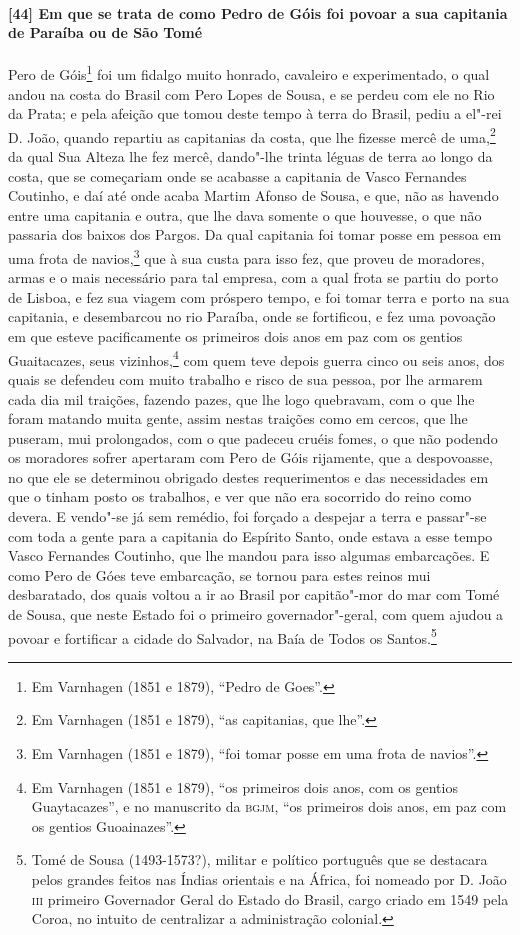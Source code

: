 \paragraph{[44] Em que se trata de como Pedro de Góis foi povoar a sua capitania de Paraíba
ou de São Tomé} \quad
Pero de Góis\footnote{ Em Varnhagen (1851 e 1879), ``Pedro de Goes''.} foi um fidalgo
muito honrado, cavaleiro e experimentado, o qual andou na costa do Brasil com Pero Lopes
de Sousa, e se perdeu com ele no Rio da Prata; e pela afeição que tomou deste tempo à
terra do Brasil, pediu a el"-rei D. João, quando repartiu as capitanias da costa, que lhe
fizesse mercê de uma,\footnote{ Em Varnhagen (1851 e 1879), ``as capitanias, que lhe''.}
da qual Sua Alteza lhe fez mercê, dando"-lhe trinta léguas de terra ao longo da costa, que
se começariam onde se acabasse a capitania de Vasco Fernandes Coutinho, e daí até onde
acaba Martim Afonso de Sousa, e que, não as havendo entre uma capitania e outra, que lhe
dava somente o que houvesse, o que não passaria dos baixos dos Pargos. Da qual capitania
foi tomar posse em pessoa em uma frota de navios,\footnote{ Em Varnhagen (1851 e 1879),
``foi tomar posse em uma frota de navios''.} que à sua custa para isso fez, que proveu de
moradores, armas e o mais necessário para tal empresa, com a qual frota se partiu do porto
de Lisboa, e fez sua viagem com próspero tempo, e foi tomar terra e porto na sua
capitania, e desembarcou no rio Paraíba, onde se fortificou, e fez uma povoação em que
esteve pacificamente os primeiros dois anos em paz com os gentios Guaitacazes, seus
vizinhos,\footnote{ Em Varnhagen (1851 e 1879), ``os primeiros dois anos, com os gentios
Guaytacazes'', e no manuscrito da \textsc{bgjm}, ``os primeiros dois anos, em paz com os
gentios Guoainazes''.} com quem teve depois guerra cinco ou seis anos, dos quais se
defendeu com muito trabalho e risco de sua pessoa, por lhe armarem cada dia mil traições,
fazendo pazes, que lhe logo quebravam, com o que lhe foram matando muita gente, assim
nestas traições como em cercos, que lhe puseram, mui prolongados, com o que padeceu cruéis
fomes, o que não podendo os moradores sofrer apertaram com Pero de Góis rijamente, que a
despovoasse, no que ele se determinou obrigado destes requerimentos e das necessidades em
que o tinham posto os trabalhos, e ver que não era socorrido do reino como devera. E
vendo"-se já sem remédio, foi forçado a despejar a terra e passar"-se com toda a gente para
a capitania do Espírito Santo, onde estava a esse tempo Vasco Fernandes Coutinho, que lhe
mandou para isso algumas embarcações. E como Pero de Góes teve embarcação, se tornou para
estes reinos mui desbaratado, dos quais voltou a ir ao Brasil por capitão"-mor do mar com
Tomé de Sousa, que neste Estado foi o primeiro governador"-geral, com quem ajudou a povoar
e fortificar a cidade do Salvador, na Baía de Todos os Santos.\footnote{ Tomé de Sousa
(1493-1573?), militar e político português que se destacara pelos grandes feitos nas
Índias orientais e na África, foi nomeado por D. João \textsc{iii} primeiro Governador
Geral do Estado do Brasil, cargo criado em 1549 pela Coroa, no intuito de centralizar a
administração colonial.}

